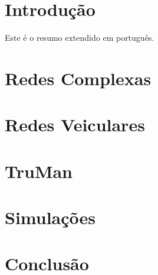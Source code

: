 \begin{resumoextendido}
		
	\section*{Introdução}
	Este é o resumo extendido em português.
	
	\section*{Redes Complexas}
	
	\section*{Redes Veiculares}
	
	\section*{TruMan}
	
	\section*{Simulações}
	
	\section*{Conclusão}
\end{resumoextendido}